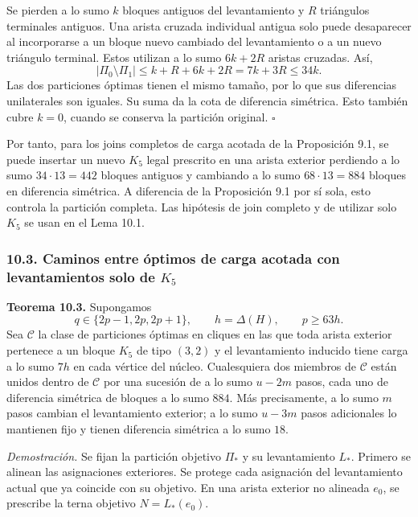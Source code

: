 \documentclass[spanish,11pt,a4paper]{article}
\begin{document}
Se pierden a lo sumo \(k\) bloques antiguos del levantamiento y \(R\)
triángulos terminales antiguos. Una arista cruzada individual antigua
solo puede desaparecer al incorporarse a un bloque nuevo cambiado del
levantamiento o a un nuevo triángulo terminal. Estos utilizan a lo sumo
\(6k+2R\) aristas cruzadas. Así, \[
|\Pi_0\setminus\Pi_1|\le k+R+6k+2R
=7k+3R\le34k.
\] Las dos particiones óptimas tienen el mismo tamaño, por lo que sus
diferencias unilaterales son iguales. Su suma da la cota de diferencia
simétrica. Esto también cubre \(k=0\), cuando se conserva la partición
original. \(\square\)

Por tanto, para los joins completos de carga acotada de la Proposición
9.1, se puede insertar un nuevo \(K_5\) legal prescrito en una arista
exterior perdiendo a lo sumo \(34\cdot13=442\) bloques antiguos y
cambiando a lo sumo \(68\cdot13=884\) bloques en diferencia simétrica. A
diferencia de la Proposición 9.1 por sí sola, esto controla la partición
completa. Las hipótesis de join completo y de utilizar solo \(K_5\) se
usan en el Lema 10.1.

\subsubsection{\texorpdfstring{10.3. Caminos entre óptimos de carga
acotada con levantamientos solo de
\(K_5\)}{10.3. Caminos entre óptimos de carga acotada con levantamientos solo de K\_5}}\label{caminos-entre-uxf3ptimos-de-carga-acotada-con-levantamientos-solo-de-k_5}

\textbf{Teorema 10.3.} Supongamos \[
q\in\{2p-1,2p,2p+1\},\qquad h=\Delta(H),\qquad p\ge63h.
\] Sea \(\mathcal C\) la clase de particiones óptimas en cliques en las
que toda arista exterior pertenece a un bloque \(K_5\) de tipo \((3,2)\)
y el levantamiento inducido tiene carga a lo sumo \(7h\) en cada vértice
del núcleo. Cualesquiera dos miembros de \(\mathcal C\) están unidos
dentro de \(\mathcal C\) por una sucesión de a lo sumo \(u-2m\) pasos,
cada uno de diferencia simétrica de bloques a lo sumo \(884\). Más
precisamente, a lo sumo \(m\) pasos cambian el levantamiento exterior; a
lo sumo \(u-3m\) pasos adicionales lo mantienen fijo y tienen diferencia
simétrica a lo sumo \(18\).

\emph{Demostración.} Se fijan la partición objetivo \(\Pi_*\) y su
levantamiento \(L_*\). Primero se alinean las asignaciones exteriores.
Se protege cada asignación del levantamiento actual que ya coincide con
su objetivo. En una arista exterior no alineada \(e_0\), se prescribe la
terna objetivo \(N=L_*(e_0)\).
\end{document}
